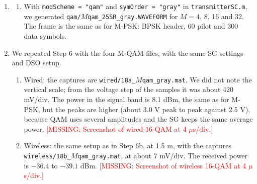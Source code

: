\documentclass[11pt]{article}
\newcommand{\missing}[1]{\textcolor{red}{[MISSING: #1]}}
\begin{document}
\begin{enumerate}[resume]
    \item
    \begin{enumerate}[label=\alph*)]
        \item With \texttt{modScheme = "qam"} and \texttt{symOrder = "gray"} in \texttt{transmitterSC.m}, we generated \texttt{qam/$M$qam\_25SR\_gray.WAVEFORM} for $M = 4$, 8, 16 and 32. The frame is the same as for M-PSK: BPSK header, 60 pilot and 300 data symbols.
    \end{enumerate}

    \item We repeated Step 6 with the four M-QAM files, with the same SG settings and DSO setup.
    \begin{enumerate}[label=\alph*)]
        \item Wired: the captures are \texttt{wired/18a\_$M$qam\_gray.mat}. We did not note the vertical scale; from the voltage step of the samples it was about 420 mV/div. The power in the signal band is 8.1 dBm, the same as for M-PSK, but the peaks are higher (about 3.0 V peak to peak against 2.5 V), because QAM uses several amplitudes and the SG keeps the same average power. \missing{Screenshot of wired 16-QAM at 4 $\mu$s/div.}
        \item Wireless: the same setup as in Step 6b, at 1.5 m, with the captures \texttt{wireless/\allowbreak 18b\_$M$qam\_gray.mat}, at about 7 mV/div. The received power is $-36.4$ to $-39.1$ dBm. \missing{Screenshot of wireless 16-QAM at 4 $\mu$s/div.}
    \end{enumerate}
\end{enumerate}
\end{document}
